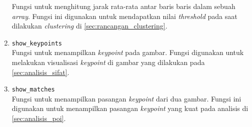 \begin{enumerate}
	Fungsi untuk menghitung jarak rata-rata antar baris baris dalam sebuah \textit{array}. Fungsi ini digunakan untuk mendapatkan nilai \textit{threshold} pada saat dilakukan \textit{clustering} di \ref{sec:rancangan_clustering}.
	\item \texttt{show\_keypoints} \\
	Fungsi untuk menampilkan \textit{keypoint} pada gambar. Fungsi digunakan untuk melakukan visualisasi \textit{keypoint} di gambar yang dilakukan pada \ref{sec:analisis_sifat}.
	\item \texttt{show\_matches} \\
	Fungsi untuk menampilkan pasangan \textit{keypoint} dari dua gambar. Fungsi ini digunakan untuk menampilkan pasangan \textit{keypoint} yang kuat pada analisis di \ref{sec:analisis_poi}.
\end{enumerate}


